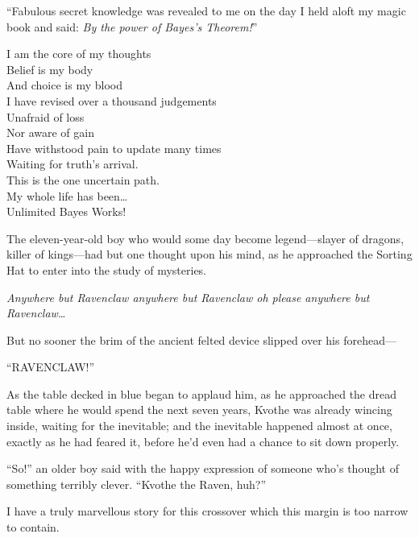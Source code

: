 \clearpage
{}

“Fabulous secret knowledge was revealed to me on the day I held aloft my magic book and said: \emph{By the power of Bayes’s Theorem!}”


\begin{emph}
I am the core of my thoughts\\
Belief is my body\\
And choice is my blood\\
I have revised over a thousand judgements\\
Unafraid of loss\\
Nor aware of gain\\
Have withstood pain to update many times\\
Waiting for truth’s arrival.\\
This is the one uncertain path.\\
My whole life has been…\\
Unlimited Bayes Works!
\end{emph}


The eleven-year-old boy who would some day become legend—slayer of dragons, killer of kings—had but one thought upon his mind, as he approached the Sorting Hat to enter into the study of mysteries.

\emph{Anywhere but Ravenclaw anywhere but Ravenclaw oh please anywhere but Ravenclaw…}

But no sooner the brim of the ancient felted device slipped over his forehead—

“RAVENCLAW!”

As the table decked in blue began to applaud him, as he approached the dread table where he would spend the next seven years, Kvothe was already wincing inside, waiting for the inevitable; and the inevitable happened almost at once, exactly as he had feared it, before he’d even had a chance to sit down properly.

“So!” an older boy said with the happy expression of someone who’s thought of something terribly clever. “Kvothe the Raven, huh?”


I have a truly marvellous story for this crossover which this margin is too narrow to contain.

